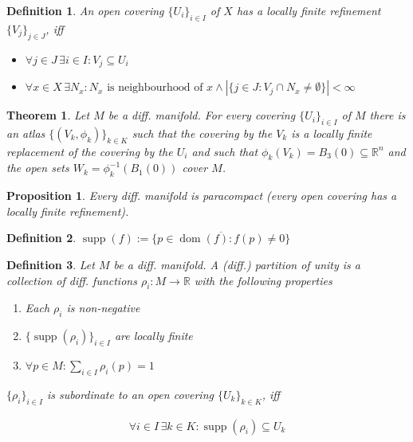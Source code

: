 \documentclass{scrartcl}
\newcommand{\R}{\mathbb R}
\newtheorem*{mydef}{Definition}
\newtheorem*{prop}{Proposition}
\newtheorem*{thm}{Theorem}
\begin{document}
\begin{mydef}
  An open covering $\{U_i\}_{i\in I}$ of $X$ has a locally finite refinement $\{V_j\}_{j\in J}$, iff

  \begin{itemize}
  \item $\forall j\in J\,\exists i\in I:V_j\subseteq U_i$
  \item $\forall x\in X\,\exists N_x: N_x\text{ is neighbourhood of }x \land |\{j\in J: V_j\cap N_x\ne\emptyset\}|<\infty$
  \end{itemize}
\end{mydef}

\begin{thm}
  Let $M$ be a diff. manifold. For every covering $\{U_i\}_{i\in I}$ of $M$ there is an atlas $\{(V_k,\phi_k)\}_{k\in K}$ such that the covering by the $V_k$ is a locally finite replacement of the covering by the $U_i$ and such that $\phi_k(V_k)=B_3(0)\subseteq \R^n$ and the open sets $W_k=\phi_k^{-1}(B_1(0))$ cover $M$.
\end{thm}

\begin{prop}
  Every diff. manifold is paracompact (every open covering has a locally finite refinement).
\end{prop}

\begin{mydef}
  $\operatorname{supp}(f) := \overline{\{p\in \operatorname{dom}(f):f(p)\ne 0\}}$
\end{mydef}

\begin{mydef}
  Let $M$ be a diff. manifold. A \emph{(diff.) partition of unity} is a collection of diff. functions $\rho_i:M\rightarrow \R$ with the following properties

  \begin{enumerate}
  \item Each $\rho_i$ is non-negative
  \item $\{\operatorname{supp}(\rho_i)\}_{i\in I}$ are locally finite
  \item $\forall p\in M: \sum_{i\in I} \rho_i(p) = 1$
  \end{enumerate}

  $\{\rho_i\}_{i\in I}$ is subordinate to an open covering $\{U_k\}_{k\in K}$, iff

  \begin{align}
   \forall i \in I\,\exists k\in K: \operatorname{supp}(\rho_i)\subseteq U_k
  \end{align}
\end{mydef}
\end{document}
